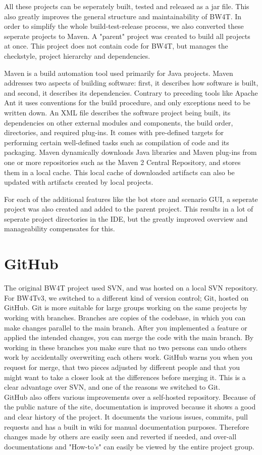 All these projects can be seperately built, tested and released as a jar file. This also greatly improves the general structure and maintainability of BW4T. In order to simplify the whole build-test-release process, we also converted these seperate projects to Maven. A "parent" project was created to build all projects at once. This project does not contain code for BW4T, but manages the checkstyle, project hierarchy and dependencies. 

Maven is a build automation tool used primarily for Java projects. Maven addresses two aspects of building software: first, it describes how software is built, and second, it describes its dependencies. Contrary to preceding tools like Apache Ant it uses conventions for the build procedure, and only exceptions need to be written down. An XML file describes the software project being built, its dependencies on other external modules and components, the build order, directories, and required plug-ins. It comes with pre-defined targets for performing certain well-defined tasks such as compilation of code and its packaging. Maven dynamically downloads Java libraries and Maven plug-ins from one or more repositories such as the Maven 2 Central Repository, and stores them in a local cache. This local cache of downloaded artifacts can also be updated with artifacts created by local projects.

For each of the additional features like the bot store and scenario GUI, a seperate project was also created and added to the parent project. This results in a lot of seperate project directories in the IDE, but the greatly improved overview and manageability compensates for this. 

\section{GitHub}
The original BW4T project used SVN, and was hosted on a local SVN repository. For BW4Tv3, we switched to a different kind of version control; Git, hosted on GitHub. Git is more suitable for large groups working on the same projects by working with branches. Branches are copies of the codebase, in which you can make changes parallel to the main branch. After you implemented a feature or applied the intended changes, you can merge the code with the main branch. By working in these branches you make sure that no two persons can undo others work by accidentally overwriting each others work. GitHub warns you when you request for merge, that two pieces adjusted by different people and that you might want to take a closer look at the differences before merging it. This is a clear advantage over SVN, and one of the reasons we switched to Git.\\
GitHub also offers various improvements over a self-hosted repository. Because of the public nature of the site, documentation is improved because it shows a good and clear history of the project. It documents the various issues, commits, pull requests and has a built in wiki for manual documentation purposes. Therefore changes made by others are easily seen and reverted if needed, and over-all documentations and "How-to's" can easily be viewed by the entire project group.

